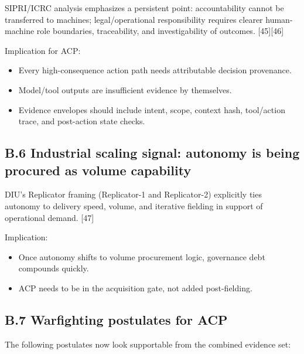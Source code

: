 \documentclass[
]{article}
\providecommand{\tightlist}{%
  \setlength{\itemsep}{0pt}\setlength{\parskip}{0pt}}
\begin{document}
SIPRI/ICRC analysis emphasizes a persistent point: accountability cannot
be transferred to machines; legal/operational responsibility requires
clearer human-machine role boundaries, traceability, and investigability
of outcomes. {[}45{]}{[}46{]}

Implication for ACP:

\begin{itemize}
\tightlist
\item
  Every high-consequence action path needs attributable decision
  provenance.
\item
  Model/tool outputs are insufficient evidence by themselves.
\item
  Evidence envelopes should include intent, scope, context hash,
  tool/action trace, and post-action state checks.
\end{itemize}

\hypertarget{b.6-industrial-scaling-signal-autonomy-is-being-procured-as-volume-capability}{%
\subsection{B.6 Industrial scaling signal: autonomy is being procured as
volume
capability}\label{b.6-industrial-scaling-signal-autonomy-is-being-procured-as-volume-capability}}

DIU's Replicator framing (Replicator-1 and Replicator-2) explicitly ties
autonomy to delivery speed, volume, and iterative fielding in support of
operational demand. {[}47{]}

Implication:

\begin{itemize}
\tightlist
\item
  Once autonomy shifts to volume procurement logic, governance debt
  compounds quickly.
\item
  ACP needs to be in the acquisition gate, not added post-fielding.
\end{itemize}

\hypertarget{b.7-warfighting-postulates-for-acp}{%
\subsection{B.7 Warfighting postulates for
ACP}\label{b.7-warfighting-postulates-for-acp}}

The following postulates now look supportable from the combined evidence
set:
\end{document}
